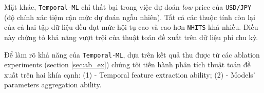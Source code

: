 \begin{table}[h]
    \centering
    \cprotect\caption{Accuracy (\%) of \verb|Temporal-ML| and \verb|NHITS| on each attribute of \verb|USD/JPY| and \verb|multi-fx|. Best results per metrics are boldfaced. (\mbox{*}): Our method.}
    \label{tab:mine_nhits_att}
\end{table}

Mặt khác, \verb|Temporal-ML| chỉ thất bại trong việc dự đoán \textit{low} price của \verb|USD/JPY| (độ chính xác tiệm cận mức dự đoán ngẫu nhiên). Tất cả các thuộc tính còn lại của cả hai tập dữ liệu đều đạt mức hội tụ cao và cao hơn \verb|NHITS| khá nhiều. Điều này chứng tỏ khả năng vượt trội của thuật toán đề xuất trên dữ liệu phi chu kỳ.

Để làm rõ khả năng của \verb|Temporal-ML|, dựa trên kết quả thu được từ các ablation experiments (section \ref{sec:ab_ex}) chúng tôi tiến hành phân tích thuật toán đề xuất trên hai khía cạnh: (1) - Temporal feature extraction ability; (2) - Models' parameters aggregation ability.


